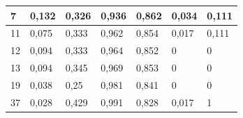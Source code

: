 \documentclass{classrep}
\begin{document}
{\begin{table}[H]
\begin{center}
\begin{tabular}{|l|l|l|l|l|l|l|}
7                                                        & 0,132                                                         & 0,326                                                            & 0,936                                                & 0,862                                                   & 0,034                                                   & 0,111                                                      \\ \hline
11                                                       & 0,075                                                         & 0,333                                                            & 0,962                                                & 0,854                                                   & 0,017                                                   & 0,111                                                      \\ \hline
12                                                       & 0,094                                                         & 0,333                                                            & 0,964                                                & 0,852                                                   & 0                                                       & 0                                                          \\ \hline
13                                                       & 0,094                                                         & 0,345                                                            & 0,969                                                & 0,853                                                   & 0                                                       & 0                                                          \\ \hline
19                                                       & 0,038                                                         & 0,25                                                             & 0,981                                                & 0,841                                                   & 0                                                       & 0                                                          \\ \hline
37                                                       & 0,028                                                         & 0,429                                                            & 0,991                                                & 0,828                                                   & 0,017                                                   & 1                                                          \\ \hline

\end{tabular}
\end{center}
\end{table}}
\end{document}
